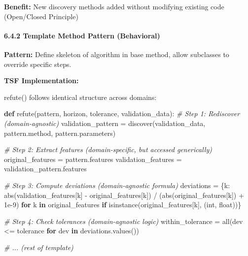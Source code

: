 \documentclass[
]{article}
\newenvironment{Shaded}{}{}
\newcommand{\BuiltInTok}[1]{\textcolor[rgb]{0.00,0.50,0.00}{#1}}
\newcommand{\CommentTok}[1]{\textcolor[rgb]{0.38,0.63,0.69}{\textit{#1}}}
\newcommand{\ControlFlowTok}[1]{\textcolor[rgb]{0.00,0.44,0.13}{\textbf{#1}}}
\newcommand{\FloatTok}[1]{\textcolor[rgb]{0.25,0.63,0.44}{#1}}
\newcommand{\KeywordTok}[1]{\textcolor[rgb]{0.00,0.44,0.13}{\textbf{#1}}}
\newcommand{\NormalTok}[1]{#1}
\newcommand{\OperatorTok}[1]{\textcolor[rgb]{0.40,0.40,0.40}{#1}}
\begin{document}
\textbf{Benefit:} New discovery methods added without modifying existing
code (Open/Closed Principle)

\paragraph{6.4.2 Template Method Pattern
(Behavioral)}\label{template-method-pattern-behavioral}

\textbf{Pattern:} Define skeleton of algorithm in base method, allow
subclasses to override specific steps.

\textbf{TSF Implementation:}

refute() follows identical structure across domains:

\begin{Shaded}
\begin{Highlighting}[]
\KeywordTok{def}\NormalTok{ refute(pattern, horizon, tolerance, validation\_data):}
    \CommentTok{\# Step 1: Rediscover (domain{-}agnostic)}
\NormalTok{    validation\_pattern }\OperatorTok{=}\NormalTok{ discover(validation\_data, pattern.method, pattern.parameters)}

    \CommentTok{\# Step 2: Extract features (domain{-}specific, but accessed generically)}
\NormalTok{    original\_features }\OperatorTok{=}\NormalTok{ pattern.features}
\NormalTok{    validation\_features }\OperatorTok{=}\NormalTok{ validation\_pattern.features}

    \CommentTok{\# Step 3: Compute deviations (domain{-}agnostic formula)}
\NormalTok{    deviations }\OperatorTok{=}\NormalTok{ \{k: }\BuiltInTok{abs}\NormalTok{(validation\_features[k] }\OperatorTok{{-}}\NormalTok{ original\_features[k]) }\OperatorTok{/}\NormalTok{ (}\BuiltInTok{abs}\NormalTok{(original\_features[k]) }\OperatorTok{+} \FloatTok{1e{-}9}\NormalTok{)}
                  \ControlFlowTok{for}\NormalTok{ k }\KeywordTok{in}\NormalTok{ original\_features }\ControlFlowTok{if} \BuiltInTok{isinstance}\NormalTok{(original\_features[k], (}\BuiltInTok{int}\NormalTok{, }\BuiltInTok{float}\NormalTok{))\}}

    \CommentTok{\# Step 4: Check tolerances (domain{-}agnostic logic)}
\NormalTok{    within\_tolerance }\OperatorTok{=} \BuiltInTok{all}\NormalTok{(dev }\OperatorTok{\textless{}=}\NormalTok{ tolerance }\ControlFlowTok{for}\NormalTok{ dev }\KeywordTok{in}\NormalTok{ deviations.values())}

    \CommentTok{\# ... (rest of template)}
\end{Highlighting}
\end{Shaded}
\end{document}
